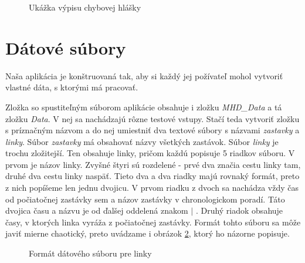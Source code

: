 \begin{figure}[H]
  \caption{Ukážka výpisu chybovej hlášky}
  \label{ukazka_chyby}
\end{figure}


\section{Dátové súbory}

Naša aplikácia je konštruovaná tak, aby si každý jej požívateľ mohol vytvoriť vlastné dáta, s ktorými má pracovať.\newline

Zložka so spustiteľným súborom aplikácie obsahuje i zložku \textit{MHD\_Data} a tá zložku \textit{Data}. V nej sa nachádzajú rôzne testové vstupy. Stačí teda vytvoriť zložku s príznačným názvom a do nej umiestniť dva textové súbory s názvami \textit{zastavky} a \textit{linky}. Súbor \textit{zastavky} má obsahovať názvy všetkých zastávok. Súbor \textit{linky} je trochu zložitejší. Ten obsahuje linky, pričom každú popisuje 5 riadkov súboru. V prvom je názov linky. Zvyšné štyri sú rozdelené - prvé dva značia cestu linky tam, druhé dva cestu linky naspäť. Tieto dva a dva riadky majú rovnaký formát, preto z nich popíšeme len jednu dvojicu. V prvom riadku z dvoch sa nachádza vždy čas od počiatočnej zastávky sem a názov zastávky v chronologickom poradí. Táto dvojica času a názvu je od ďalšej oddelená znakom $|$ . Druhý riadok obsahuje časy, v ktorých linka vyráža z počiatočnej zastávky. Formát tohto súboru sa môže javiť mierne chaotický, preto uvádzame i obrázok \ref{Format_datoveho_suboru1}, ktorý ho názorne popisuje.\newline

\begin{figure}[H]
  \caption{Formát dátového súboru pre linky}
  \label{Format_datoveho_suboru1}
\end{figure}

